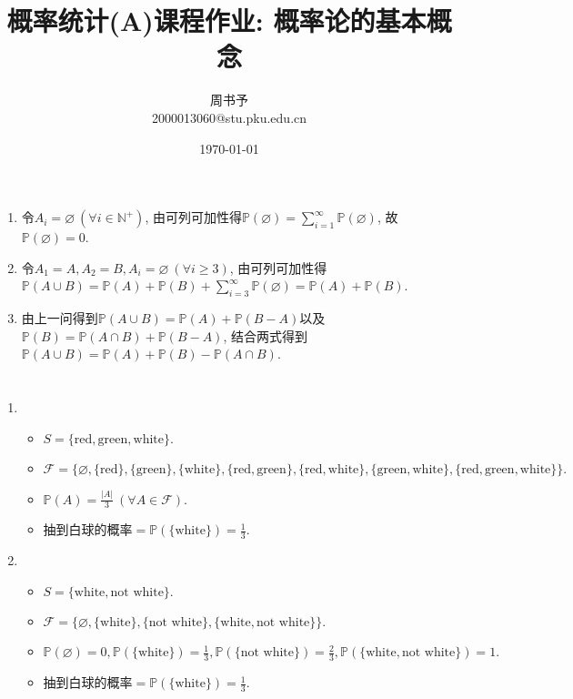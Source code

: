\documentclass[8pt]{article}
\title{\heiti\zihao{2} 概率统计(A)课程作业: 概率论的基本概念}
\author{\kaishu\zihao{-3} 周书予\\2000013060@stu.pku.edu.cn}
\date{\today}
\theoremstyle{compact}
\def\ge{\geqslant}
\def\P#1{\mathbb{P}\left({#1}\right)}
\begin{document}
\pagestyle{fancy}


\maketitle

\section{}
	\begin{enumerate}
		\item 令$A_i = \varnothing\ (\forall i \in \mathbb N^+)$, 由可列可加性得$\P{\varnothing} = \sum\limits_{i=1}^{\infty}\P{\varnothing}$, 故$\P{\varnothing} = 0$.
		\item 令$A_1 = A, A_2 = B, A_i = \varnothing\ (\forall i \ge 3)$, 由可列可加性得$\P{A \cup B} = \P{A} + \P{B} + \sum\limits_{i=3}^{\infty}\P{\varnothing} = \P{A} + \P{B}$.	
		\item 由上一问得到$\P{A \cup B} = \P{A} + \P{B - A}$以及$\P{B} = \P{A \cap B} + \P{B - A}$, 结合两式得到$\P{A \cup B} = \P{A} + \P{B} - \P{A \cap B}$.
	\end{enumerate}

\section{}
	\begin{enumerate}
		\item
			\begin{itemize}
				\item $S = \{\textrm{red}, \textrm{green}, \textrm{white}\}$.
				\item $\mathcal F = \{\varnothing, 
				                     \{\textrm{red}\},
				                     \{\textrm{green}\},
				                     \{\textrm{white}\},
									 \{\textrm{red}, \textrm{green}\},
									 \{\textrm{red}, \textrm{white}\},
									 \{\textrm{green}, \textrm{white}\},
									 \{\textrm{red}, \textrm{green}, \textrm{white}\}
									 \}.$
				\item $\P{A} = \frac{|A|}{3}\ (\forall A \in \mathcal F).$
				\item 抽到白球的概率$= \P{\{\textrm{white}\}} = \frac13.$
			\end{itemize}
		\item
		\begin{itemize}
			\item $S = \{\textrm{white}, \textrm{not white}\}$.
			\item $\mathcal F = \{\varnothing, 
								 \{\textrm{white}\},
								 \{\textrm{not white}\},
								 \{\textrm{white}, \textrm{not white}\}
								 \}.$
			\item $\P{\varnothing} = 0, \P{\{\textrm{white}\}} = \frac13, \P{\{\textrm{not white}\}} = \frac23, \P{\{\textrm{white}, \textrm{not white}\}} = 1.$
			\item 抽到白球的概率$= \P{\{\textrm{white}\}} = \frac13.$
		\end{itemize}
	\end{enumerate}
\end{document}
